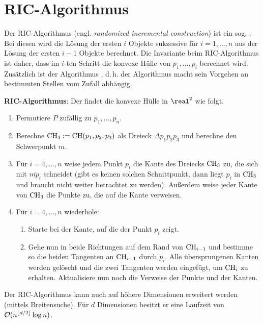 \pagebreak

\section{%
    RIC-Algorithmus%
}

Der RIC-Algorithmus (engl. \emph{randomized incremental construction}) ist ein sog.
.
Bei diesen wird die Lösung der ersten $i$ Objekte sukzessive für $i = 1, \dotsc, n$ aus
der Lösung der ersten $i - 1$ Objekte berechnet.
Die Invariante beim RIC-Algorithmus ist daher, dass im $i$-ten Schritt die konvexe
Hülle von $p_1, \dotsc, p_i$ berechnet wird.
Zusätzlich ist der Algorithmus , d.\,h.
der Algorithmus macht sein Vorgehen an bestimmten Stellen vom Zufall abhängig.

\textbf{RIC-Algorithmus}:
Der  findet die konvexe Hülle in $\real^2$ wie folgt.
\begin{enumerate}
    \item
    Permutiere $P$ zufällig zu $p_1, \dotsc, p_n$.

    \item
    Berechne $\operatorname{CH}_3 := \operatorname{CH}(p_1, p_2, p_3)$ als Dreieck $\Delta p_1 p_2 p_3$ und
    berechne den Schwerpunkt $m$.

    \item
    Für $i = 4, \dotsc, n$ weise jedem Punkt $p_i$ die Kante des Dreiecks $\operatorname{CH}_3$ zu,
    die sich mit $\overline{mp_i}$ schneidet
    (gibt es keinen solchen Schnittpunkt, dann liegt $p_i$ in $\operatorname{CH}_3$ und braucht nicht weiter
    betrachtet zu werden).
    Außerdem weise jeder Kante von $\operatorname{CH}_3$ die Punkte zu, die auf die Kante verweisen.

    \item
    Für $i = 4, \dotsc, n$ wiederhole:
    \begin{enumerate}[label=\emph{(\roman*)}]
        \item
        Starte bei der Kante, auf die der Punkt $p_i$ zeigt.

        \item
        Gehe nun in beide Richtungen auf dem Rand von $\operatorname{CH}_{i-1}$ und bestimme so
        die beiden Tangenten an $\operatorname{CH}_{i-1}$ durch $p_i$.
        Alle übersprungenen Kanten werden gelöscht und die zwei Tangenten werden eingefügt,
        um $\operatorname{CH}_i$ zu erhalten.
        Aktualisiere nun noch die Verweise der Punkte und der Kanten.
    \end{enumerate}
\end{enumerate}
Der RIC-Algorithmus kann auch auf höhere Dimensionen erweitert werden
(mittels Breitensuche).
Für $d$ Dimensionen besitzt er eine Laufzeit von $\mathcal{O}(n^{\lfloor d/2 \rfloor} \log n)$.

